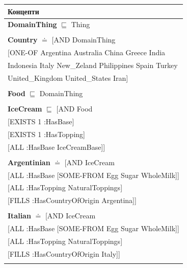 \documentclass[12pt]{article}
\newcommand*{\MyIndent}{\hspace*{7em}}
\begin{document}
        \begin{tabularx}{1\textwidth}{@{}X@{}}
        \toprule
        \textbf{Концепти} \\
        \midrule
        \endhead

            \textbf{DomainThing} $\sqsubseteq$ Thing \\ \tabularnewline
        
            \textbf{Country} $\doteq$ [AND DomainThing \\
                            \MyIndent [ONE-OF Argentina Australia China Greece India \\
                                    \MyIndent Indonesia Italy New\_Zeland Philippines Spain Turkey \\
                                    \MyIndent United\_Kingdom United\_States Iran] \\
                            \tabularnewline

            \textbf{Food} $\sqsubseteq$ DomainThing \\ \tabularnewline


            
            \textbf{IceCream} $\sqsubseteq$ [AND Food \\
                                      \MyIndent [EXISTS 1 :HasBase] \\
                                      \MyIndent [EXISTS 1 :HasTopping] \\
                                      \MyIndent [ALL :HasBase IceCreamBase]] \\
                                      \tabularnewline
           
            \textbf{Argentinian} $\doteq$ [AND IceCream \\
                                            \MyIndent [ALL :HasBase [SOME-FROM Egg Sugar WholeMilk]] \\
                                              \MyIndent [ALL :HasTopping NaturalToppings] \\
                                              \MyIndent [FILLS :HasCountryOfOrigin Argentina]] \\
                                              \tabularnewline
           
            \textbf{Italian} $\doteq$ [AND IceCream \\
                                          \MyIndent [ALL :HasBase [SOME-FROM Egg Sugar WholeMilk]] \\
                                          \MyIndent [ALL :HasTopping NaturalToppings] \\
                                          \MyIndent [FILLS :HasCountryOfOrigin Italy]] \\
                                          \tabularnewline
            

\end{tabularx}
\end{document}
